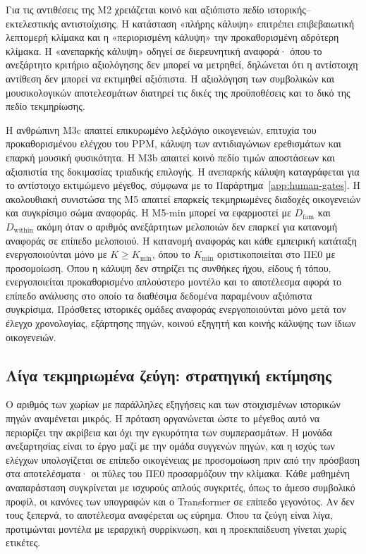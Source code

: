 \documentclass[11pt,a4paper]{article}
\begin{document}
Για τις αντιθέσεις της M2 χρειάζεται κοινό και αξιόπιστο πεδίο ιστορικής--εκτελεστικής αντιστοίχισης. Η κατάσταση «πλήρης κάλυψη» επιτρέπει επιβεβαιωτική λεπτομερή κλίμακα και η «περιορισμένη κάλυψη» την προκαθορισμένη αδρότερη κλίμακα. Η «ανεπαρκής κάλυψη» οδηγεί σε διερευνητική αναφορά· όπου το ανεξάρτητο κριτήριο αξιολόγησης δεν μπορεί να μετρηθεί, δηλώνεται ότι η αντίστοιχη αντίθεση δεν μπορεί να εκτιμηθεί αξιόπιστα. Η αξιολόγηση των συμβολικών και μουσικολογικών αποτελεσμάτων διατηρεί τις δικές της προϋποθέσεις και το δικό της πεδίο τεκμηρίωσης.

Η ανθρώπινη M3c απαιτεί επικυρωμένο λεξιλόγιο οικογενειών, επιτυχία του προκαθορισμένου ελέγχου του PPM, κάλυψη των αντιδιαγώνιων ερεθισμάτων και επαρκή μουσική φυσικότητα. Η M3b απαιτεί κοινό πεδίο τιμών αποστάσεων και αξιοπιστία της δοκιμασίας τριαδικής επιλογής. Η ανεπαρκής κάλυψη καταγράφεται για το αντίστοιχο εκτιμώμενο μέγεθος, σύμφωνα με το Παράρτημα~\ref{app:human-gates}. Η ακολουθιακή συνιστώσα της M5 απαιτεί επαρκείς τεκμηριωμένες διαδοχές οικογενειών και συγκρίσιμο σώμα αναφοράς. Η M5-min μπορεί να εφαρμοστεί με $D_{\mathrm{fam}}$ και $D_{\mathrm{within}}$ ακόμη όταν ο αριθμός ανεξάρτητων μελοποιών δεν επαρκεί για κατανομή αναφοράς σε επίπεδο μελοποιού. Η κατανομή αναφοράς και κάθε εμπειρική κατάταξη ενεργοποιούνται μόνο με $K\ge K_{\min}$, όπου το $K_{\min}$ οριστικοποιείται στο ΠΕ0 με προσομοίωση. Όπου η κάλυψη δεν στηρίζει τις συνθήκες ήχου, είδους ή τόπου, ενεργοποιείται προκαθορισμένο απλούστερο μοντέλο και το αποτέλεσμα αφορά το επίπεδο ανάλυσης στο οποίο τα διαθέσιμα δεδομένα παραμένουν αξιόπιστα συγκρίσιμα. Πρόσθετες ιστορικές ομάδες αναφοράς ενεργοποιούνται μόνο μετά τον έλεγχο χρονολογίας, εξάρτησης πηγών, κοινού εξηγητή και κοινής κάλυψης των ίδιων οικογενειών.

\subsection{Λίγα τεκμηριωμένα ζεύγη: στρατηγική εκτίμησης}\label{sec:small-data}

Ο αριθμός των χωρίων με παράλληλες εξηγήσεις και των στοιχισμένων ιστορικών πηγών αναμένεται μικρός. Η πρόταση οργανώνεται ώστε το μέγεθος αυτό να περιορίζει την ακρίβεια και όχι την εγκυρότητα των συμπερασμάτων. Η μονάδα ανεξαρτησίας είναι το έργο μαζί με την ομάδα συγγενών πηγών, και η ισχύς των ελέγχων υπολογίζεται σε επίπεδο οικογένειας με προσομοίωση πριν από την πρόσβαση στα αποτελέσματα· οι πύλες του ΠΕ0 προσαρμόζουν την κλίμακα. Κάθε μαθημένη αναπαράσταση συγκρίνεται με ισχυρούς απλούς συγκριτές, όπως το άμεσο συμβολικό προφίλ, οι κανόνες των υπογραφών και ο Transformer σε επίπεδο γεγονότος. Αν δεν τους ξεπερνά, το αποτέλεσμα αναφέρεται ως εύρημα. Όπου τα ζεύγη είναι λίγα, προτιμώνται μοντέλα με ιεραρχική συρρίκνωση, και η προεκπαίδευση γίνεται χωρίς ετικέτες.
\end{document}
